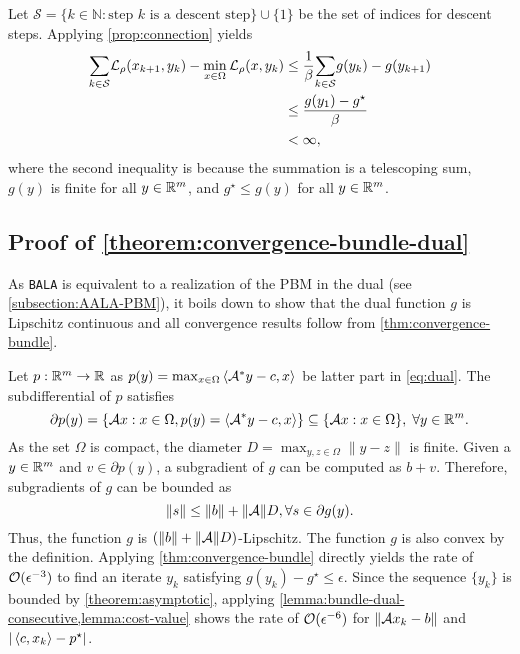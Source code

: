 \documentclass[11pt]{article}
\newcommand{\alg}{\texttt{BALA}}%
\begin{document}
Let $\mathcal{S} = \{ k\in \mathbb{N} :\text{step } k \text{ is a descent step}\} \cup \{1\}$ be the set of indices for descent steps. Applying \cref{prop:connection} yields
\begin{equation}
    \begin{aligned}
        \label{eq:sum-bounded}
         { \sum_{k \in \mathcal{S}}}  \mathcal{L}_\rho(x_{k+1},y_k) - \min_{x\in \Omega} \mathcal{L}_\rho(x,y_k)
      &\leq   \frac{1}{\beta} { \sum_{k \in \mathcal{S}}}g(y_k) - g(y_{k+1}) \\
      &\leq \frac{g(y_1) - g^\star}{\beta} \\
      & < \infty,
    \end{aligned}
\end{equation}
where the second inequality is because the summation is a telescoping sum, $g(y)$ is finite for all $y \in \mathbb{R}^m$, and $g^\star \leq g(y)$ for all $y \in \mathbb{R}^m$.     

\subsection{Proof of \cref{theorem:convergence-bundle-dual}}
\label{apx:theorem:convergence-bundle-dual}
As \alg{} is equivalent to a realization of the PBM in the dual (see \cref{subsection:AALA-PBM}), it boils down to show that the dual function $g$ is Lipschitz continuous and all convergence results follow from \cref{thm:convergence-bundle}.

 Let $p : \mathbb{R}^m \to \mathbb{R}$ as $ p(y) = \max_{x \in \Omega } \left \langle \mathcal{A}^* y - c, x \right\rangle$ be latter part in \cref{eq:dual}. The subdifferential of $p$ satisfies 
 $$
 \partial p(y) = \{ \mathcal{A} x : x \in \Omega, p(y) = \left \langle \mathcal{A}^* y - c, x \right\rangle \} \subseteq  \{ \mathcal{A} x : x \in \Omega \},\; \forall y \in \mathbb{R}^m.
 $$ 
 As the set $\Omega$ is compact, the diameter $D = \max_{y,z \in \Omega} \|y-z\|$ is finite. Given a $y \in \mathbb{R}^m$ and $v\in \partial p(y)$, a subgradient of $g$ can be computed as $b + v.$ Therefore, subgradients of $g$ can be bounded as 
    \begin{equation*}
         \|s\|\leq \|b\| + \|\mathcal{A}\| D, \forall s \in \partial g(y).
    \end{equation*}
    Thus, the function $g$ is $(\|b\| + \|\mathcal{A}\|D)$-Lipschitz. The function $g$ is also convex by the definition. Applying \cref{thm:convergence-bundle} directly yields the rate of $\mathcal{O}(\epsilon^{-3})$ to find an iterate $y_k$ satisfying $g(y_k) - g^\star \leq \epsilon$. Since the sequence $\{y_k\}$ is bounded by \cref{theorem:asymptotic}, applying \cref{lemma:bundle-dual-consecutive,lemma:cost-value} shows the rate of $\mathcal{O}(\epsilon^{-6})$ for $\|\mathcal{A} x_{k} - b\|$ and $|\left \langle c, x_{k} \right\rangle - p^\star|$.
\end{document}
